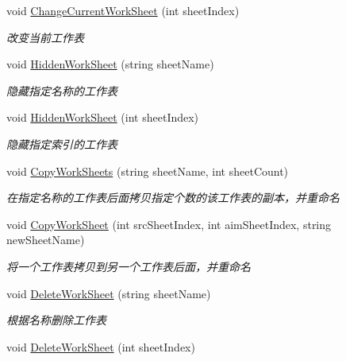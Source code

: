 \begin{DoxyCompactItemize}
void \hyperlink{class_x_c_l_net_tools_1_1_office_1_1_excel_handler_1_1_excel_helper_a626d1643db6d20fb63ba1166043dbc31}{Change\-Current\-Work\-Sheet} (int sheet\-Index)
\begin{DoxyCompactList}\small\item\em 改变当前工作表 \end{DoxyCompactList}\item 
void \hyperlink{class_x_c_l_net_tools_1_1_office_1_1_excel_handler_1_1_excel_helper_a9aaab80ccb46c62132165fd20790e3d0}{Hidden\-Work\-Sheet} (string sheet\-Name)
\begin{DoxyCompactList}\small\item\em 隐藏指定名称的工作表 \end{DoxyCompactList}\item 
void \hyperlink{class_x_c_l_net_tools_1_1_office_1_1_excel_handler_1_1_excel_helper_a96b25f831723c0a7b3522447af7c4336}{Hidden\-Work\-Sheet} (int sheet\-Index)
\begin{DoxyCompactList}\small\item\em 隐藏指定索引的工作表 \end{DoxyCompactList}\item 
void \hyperlink{class_x_c_l_net_tools_1_1_office_1_1_excel_handler_1_1_excel_helper_a628ecdd26ecf5c685ad7c2ab076cf36b}{Copy\-Work\-Sheets} (string sheet\-Name, int sheet\-Count)
\begin{DoxyCompactList}\small\item\em 在指定名称的工作表后面拷贝指定个数的该工作表的副本，并重命名 \end{DoxyCompactList}\item 
void \hyperlink{class_x_c_l_net_tools_1_1_office_1_1_excel_handler_1_1_excel_helper_a730eefd07f0b338d62000d58b6791ca1}{Copy\-Work\-Sheet} (int src\-Sheet\-Index, int aim\-Sheet\-Index, string new\-Sheet\-Name)
\begin{DoxyCompactList}\small\item\em 将一个工作表拷贝到另一个工作表后面，并重命名 \end{DoxyCompactList}\item 
void \hyperlink{class_x_c_l_net_tools_1_1_office_1_1_excel_handler_1_1_excel_helper_adc2bee7e717436f8bc586c5a0d149d3e}{Delete\-Work\-Sheet} (string sheet\-Name)
\begin{DoxyCompactList}\small\item\em 根据名称删除工作表 \end{DoxyCompactList}\item 
void \hyperlink{class_x_c_l_net_tools_1_1_office_1_1_excel_handler_1_1_excel_helper_abbd230c249186909fa47978177315cc5}{Delete\-Work\-Sheet} (int sheet\-Index)

\end{DoxyCompactItemize}
